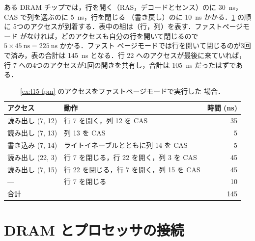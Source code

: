 \documentclass[../main.tex]{subfiles}
\begin{document}
\begin{example}
  \label{ex:l15-fpm}
  ある DRAM チップでは，行を開く（RAS，デコードとセンス）のに
  \SI{30}{\nano\second}，CAS で列を選ぶのに \SI{5}{\nano\second}，行を閉じる
  （書き戻し）のに \SI{10}{\nano\second} かかる．\cref{tab:l15-fpm} の順に
  5つのアクセスが到着する．表中の組は（行，列）を表す．ファストページモード
  がなければ，どのアクセスも自分の行を開いて閉じるので
  $5\times\SI{45}{\nano\second} = \SI{225}{\nano\second}$ かかる．ファスト
  ページモードでは行を開いて閉じるのが3回で済み，表の合計は
  \SI{145}{\nano\second} となる．行 22 へのアクセスが最後に来ていれば，
  行 7 への4つのアクセスが1回の開きを共有し，合計は \SI{105}{\nano\second}
  だったはずである．
\end{example}

\begin{table}[htbp]
  \centering\small
  \caption{\cref{ex:l15-fpm} のアクセスをファストページモードで実行した
    場合．}
  \label{tab:l15-fpm}
  \begin{tabular}{@{}llr@{}}
    \toprule
    アクセス          & 動作                                    & 時間 (ns) \\
    \midrule
    読み出し (7, 12)  & 行 7 を開く，列 12 を CAS                & 35 \\
    読み出し (7, 13)  & 列 13 を CAS                            & 5 \\
    書き込み (7, 14)  & ライトイネーブルとともに列 14 を CAS      & 5 \\
    読み出し (22, 3)  & 行 7 を閉じる，行 22 を開く，列 3 を CAS  & 45 \\
    読み出し (7, 15)  & 行 22 を閉じる，行 7 を開く，列 15 を CAS & 45 \\
    ---               & 行 7 を閉じる                            & 10 \\
    \midrule
    合計              &                                         & 145 \\
    \bottomrule
  \end{tabular}
\end{table}

\section{DRAM とプロセッサの接続}
\label{sec:l15-connection}
\end{document}
